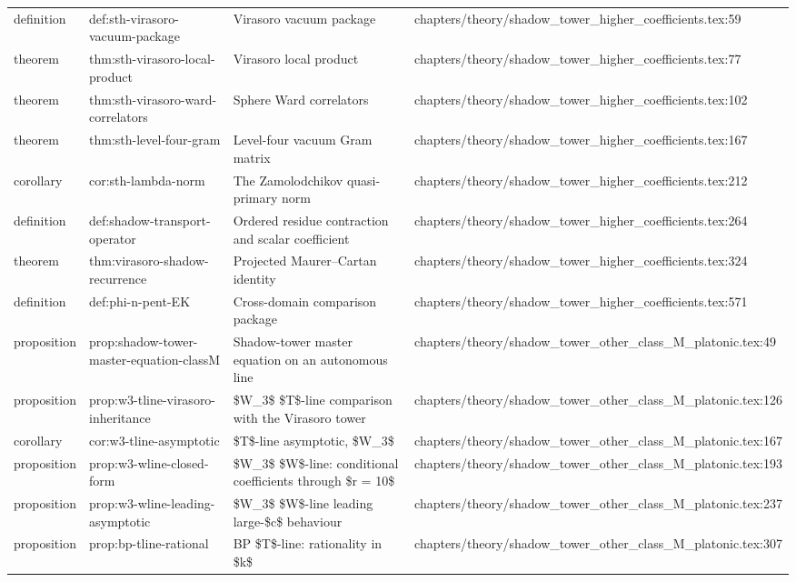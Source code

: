 \documentclass[11pt]{article}
\begin{document}
\begin{longtable}{L{0.10\textwidth}L{0.26\textwidth}L{0.42\textwidth}L{0.22\textwidth}}
definition & def:sth-virasoro-vacuum-package & Virasoro vacuum package & chapters/theory/shadow\_tower\_higher\_coefficients.tex:59\\
theorem & thm:sth-virasoro-local-product & Virasoro local product & chapters/theory/shadow\_tower\_higher\_coefficients.tex:77\\
theorem & thm:sth-virasoro-ward-correlators & Sphere Ward correlators & chapters/theory/shadow\_tower\_higher\_coefficients.tex:102\\
theorem & thm:sth-level-four-gram & Level-four vacuum Gram matrix & chapters/theory/shadow\_tower\_higher\_coefficients.tex:167\\
corollary & cor:sth-lambda-norm & The Zamolodchikov quasi-primary norm & chapters/theory/shadow\_tower\_higher\_coefficients.tex:212\\
definition & def:shadow-transport-operator & Ordered residue contraction and scalar coefficient & chapters/theory/shadow\_tower\_higher\_coefficients.tex:264\\
theorem & thm:virasoro-shadow-recurrence & Projected Maurer--Cartan identity & chapters/theory/shadow\_tower\_higher\_coefficients.tex:324\\
definition & def:phi-n-pent-EK & Cross-domain comparison package & chapters/theory/shadow\_tower\_higher\_coefficients.tex:571\\
proposition & prop:shadow-tower-master-equation-classM & Shadow-tower master equation on an autonomous line & chapters/theory/shadow\_tower\_other\_class\_M\_platonic.tex:49\\
proposition & prop:w3-tline-virasoro-inheritance & \$W\_3\$ \$T\$-line comparison with the Virasoro tower & chapters/theory/shadow\_tower\_other\_class\_M\_platonic.tex:126\\
corollary & cor:w3-tline-asymptotic & \$T\$-line asymptotic, \$W\_3\$ & chapters/theory/shadow\_tower\_other\_class\_M\_platonic.tex:167\\
proposition & prop:w3-wline-closed-form & \$W\_3\$ \$W\$-line: cond{}itional coefficients through \$r = 10\$ & chapters/theory/shadow\_tower\_other\_class\_M\_platonic.tex:193\\
proposition & prop:w3-wline-leading-asymptotic & \$W\_3\$ \$W\$-line leading large-\$c\$ behaviour & chapters/theory/shadow\_tower\_other\_class\_M\_platonic.tex:237\\
proposition & prop:bp-tline-rational & BP \$T\$-line: rationality in \$k\$ & chapters/theory/shadow\_tower\_other\_class\_M\_platonic.tex:307\\

\end{longtable}
\end{document}
